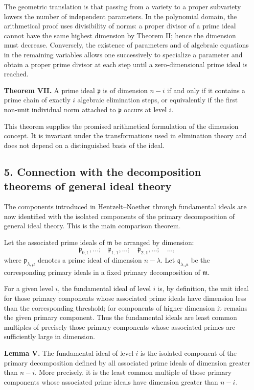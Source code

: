 \documentclass[12pt]{article}
\begin{document}
The geometric translation is that passing from a variety to a proper subvariety lowers the number of independent parameters. In the polynomial domain, the arithmetical proof uses divisibility of norms: a proper divisor of a prime ideal cannot have the same highest dimension by Theorem II; hence the dimension must decrease. Conversely, the existence of parameters and of algebraic equations in the remaining variables allows one successively to specialize a parameter and obtain a proper prime divisor at each step until a zero-dimensional prime ideal is reached.

\textbf{Theorem VII.} A prime ideal $\mathfrak p$ is of dimension $n-i$ if and only if it contains a prime chain of exactly $i$ algebraic elimination steps, or equivalently if the first non-unit individual norm attached to $\mathfrak p$ occurs at level $i$.

This theorem supplies the promised arithmetical formulation of the dimension concept. It is invariant under the transformations used in elimination theory and does not depend on a distinguished basis of the ideal.

\subsection{5. Connection with the decomposition theorems of general ideal theory}

The components introduced in Hentzelt--Noether through fundamental ideals are now identified with the isolated components of the primary decomposition of general ideal theory. This is the main comparison theorem.

Let the associated prime ideals of $\mathfrak m$ be arranged by dimension:
\[
  \mathfrak p_{0,1},\ldots;\quad \mathfrak p_{1,1},\ldots;\quad \mathfrak p_{2,1},\ldots;\quad\ldots,
\]
where $\mathfrak p_{\lambda,\mu}$ denotes a prime ideal of dimension $n-\lambda$. Let $\mathfrak q_{\lambda,\mu}$ be the corresponding primary ideals in a fixed primary decomposition of $\mathfrak m$.

For a given level $i$, the fundamental ideal of level $i$ is, by definition, the unit ideal for those primary components whose associated prime ideals have dimension less than the corresponding threshold; for components of higher dimension it remains the given primary component. Thus the fundamental ideals are least common multiples of precisely those primary components whose associated primes are sufficiently large in dimension.

\textbf{Lemma V.} The fundamental ideal of level $i$ is the isolated component of the primary decomposition defined by all associated prime ideals of dimension greater than $n-i$. More precisely, it is the least common multiple of those primary components whose associated prime ideals have dimension greater than $n-i$.
\end{document}
